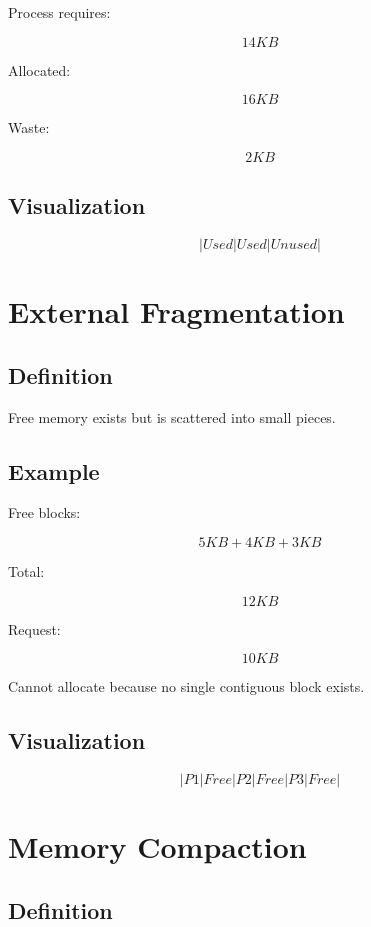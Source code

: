 Process requires:

\[
14KB
\]

Allocated:

\[
16KB
\]

Waste:

\[
2KB
\]

\subsection{Visualization}

\[
| Used | Used | Unused |
\]

\section{External Fragmentation}

\subsection{Definition}

Free memory exists but is scattered into small pieces.

\subsection{Example}

Free blocks:

\[
5KB + 4KB + 3KB
\]

Total:

\[
12KB
\]

Request:

\[
10KB
\]

Cannot allocate because no single contiguous block exists.

\subsection{Visualization}

\[
|P1|Free|P2|Free|P3|Free|
\]

\section{Memory Compaction}

\subsection{Definition}

